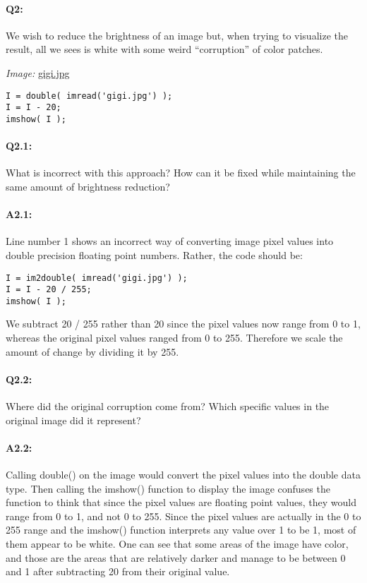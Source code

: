 \documentclass[11pt]{article}
\begin{document}

\pagebreak
\paragraph{Q2:} We wish to reduce the brightness of an image but, when trying to visualize the result, all we sees is white with some weird ``corruption'' of color patches.

\emph{Image:} \href{gigi.jpg}{gigi.jpg}

\begin{lstlisting}[style=Matlab-editor]
I = double( imread('gigi.jpg') );
I = I - 20;
imshow( I );
\end{lstlisting}

\paragraph{Q2.1:} What is incorrect with this approach? How can it be fixed while maintaining the same amount of brightness reduction?

\paragraph{A2.1:}
Line number 1 shows an incorrect way of converting image pixel values into double precision floating point numbers. Rather, the code should be:
\begin{lstlisting}[style=Matlab-editor]
I = im2double( imread('gigi.jpg') );
I = I - 20 / 255;
imshow( I );
\end{lstlisting}
We subtract 20 / 255 rather than 20 since the pixel values now range from 0 to 1, whereas the original pixel values ranged from 0 to 255. Therefore we scale the amount of change by dividing it by 255.


\pagebreak
\paragraph{Q2.2:} Where did the original corruption come from? Which specific values in the original image did it represent?

\paragraph{A2.2:}
Calling double() on the image would convert the pixel values into the double data type. Then calling the imshow() function to display the image confuses the function to think that since the pixel values are floating point values, they would range from 0 to 1, and not 0 to 255. Since the pixel values are actually in the 0 to 255 range and the imshow() function interprets any value over 1 to be 1, most of them appear to be white. One can see that some areas of the image have color, and those are the areas that are relatively darker and manage to be between 0 and 1 after subtracting 20 from their original value.


\end{document}
